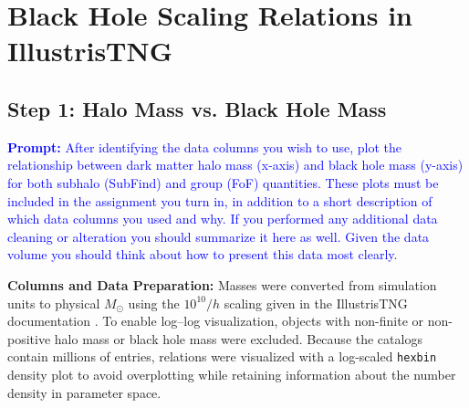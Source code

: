 \documentclass[twocolumn]{aastex631}
\begin{document}

\clearpage
{}




\section{Black Hole Scaling Relations in IllustrisTNG}

\subsection{Step 1: Halo Mass vs. Black Hole Mass}

\textcolor{blue}{\textbf{Prompt:} After identifying the data columns you wish to use, plot the relationship between dark matter halo mass (x-axis) and black hole mass (y-axis) for both subhalo (SubFind) and group (FoF) quantities. 
These plots must be included in the assignment you turn in, in addition to a short description of which 
data columns you used and why. If you performed any additional data cleaning or alteration you should 
summarize it here as well. Given the data volume you should think about how to present this data most 
clearly.}

\textbf{Columns and Data Preparation:}
Masses were converted from simulation units to physical $M_\odot$ using the $10^{10}/h$ scaling given in the IllustrisTNG documentation . To enable log--log visualization, objects with non-finite or non-positive halo mass or black hole mass were excluded. Because the catalogs contain millions of entries, relations were visualized with a log-scaled \texttt{hexbin} density plot to avoid overplotting while retaining information about the number density in parameter space.
\end{document}
